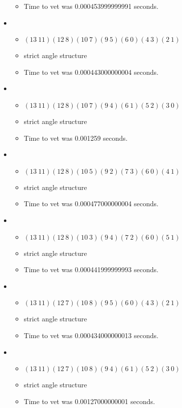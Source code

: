\documentclass{article}
\begin{document}
\begin{itemize}
\begin{itemize}
      \item Time to vet was 0.000453999999991 seconds.
\end{itemize}
\item \begin{itemize}
      \item $(13\ 11)(12\ 8)(10\ 7)(9\ 5)(6\ 0)(4\ 3)(2\ 1)$
      \item strict angle structure
      \item Time to vet was 0.000443000000004 seconds.
\end{itemize}
\item \begin{itemize}
      \item $(13\ 11)(12\ 8)(10\ 7)(9\ 4)(6\ 1)(5\ 2)(3\ 0)$
      \item strict angle structure
      \item Time to vet was 0.001259 seconds.
\end{itemize}
\item \begin{itemize}
      \item $(13\ 11)(12\ 8)(10\ 5)(9\ 2)(7\ 3)(6\ 0)(4\ 1)$
      \item strict angle structure
      \item Time to vet was 0.000477000000004 seconds.
\end{itemize}
\item \begin{itemize}
      \item $(13\ 11)(12\ 8)(10\ 3)(9\ 4)(7\ 2)(6\ 0)(5\ 1)$
      \item strict angle structure
      \item Time to vet was 0.000441999999993 seconds.
\end{itemize}
\item \begin{itemize}
      \item $(13\ 11)(12\ 7)(10\ 8)(9\ 5)(6\ 0)(4\ 3)(2\ 1)$
      \item strict angle structure
      \item Time to vet was 0.000434000000013 seconds.
\end{itemize}
\item \begin{itemize}
      \item $(13\ 11)(12\ 7)(10\ 8)(9\ 4)(6\ 1)(5\ 2)(3\ 0)$
      \item strict angle structure
      \item Time to vet was 0.00127000000001 seconds.

\end{itemize}
\end{itemize}
\end{document}
